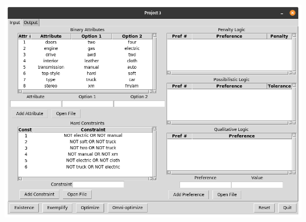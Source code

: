 \documentclass[12pt]{report}
\begin{document}
\includegraphics[scale=0.3]{constraints_imported}\\
\end{document}
